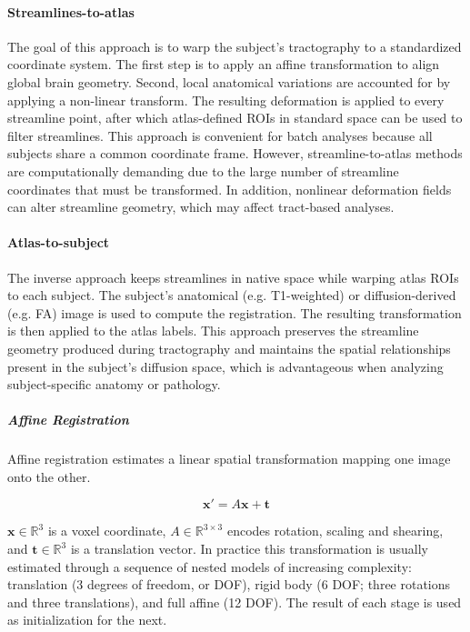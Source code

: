 \paragraph{Streamlines-to-atlas} The goal of this approach is to warp the subject's tractography to a standardized coordinate system. The first step is to apply an affine transformation to align global brain geometry. Second, local anatomical variations are accounted for by applying a non-linear transform. The resulting deformation is applied to every streamline point, after which atlas-defined ROIs in standard space can be used to filter streamlines. This approach is convenient for batch analyses because all subjects share a common coordinate frame. However, streamline-to-atlas methods are computationally demanding due to the large number of streamline coordinates that must be transformed. In addition, nonlinear deformation fields can alter streamline geometry, which may affect tract-based analyses.

\paragraph{Atlas-to-subject} The inverse approach keeps streamlines in native space while warping atlas ROIs to each subject. The subject's anatomical (e.g. T1-weighted) or diffusion-derived (e.g. FA) image is used to compute the registration. The resulting transformation is then applied to the atlas labels. This approach preserves the streamline geometry produced during tractography and maintains the spatial relationships present in the subject's diffusion space, which is advantageous when analyzing subject-specific anatomy or pathology.

\subparagraph{Affine Registration}

Affine registration estimates a linear spatial transformation mapping one image onto the other.

\begin{equation}
	\mathbf{x}' = A\mathbf{x} + \mathbf{t}
	\label{eq:affine_transform}
\end{equation}

$\mathbf{x} \in \mathbb{R}^3$ is a voxel coordinate, $A \in \mathbb{R}^{3 \times 3}$ encodes rotation, scaling and shearing, and $\mathbf{t} \in \mathbb{R}^3$ is a translation vector. In practice this transformation is usually estimated through a sequence of nested models of increasing complexity: translation (3 degrees of freedom, or DOF), rigid body (6 DOF; three rotations and three translations), and full affine (12 DOF). The result of each stage is used as initialization for the next.


